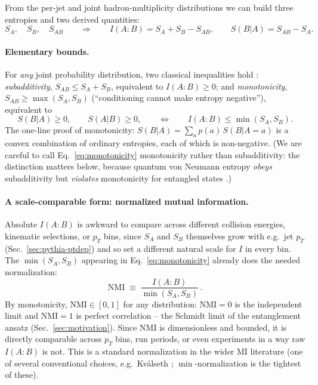 \documentclass[11pt]{article}
\newcommand{\SBA}{S(B|A)}
\newcommand{\NMI}{\mathrm{NMI}}
\begin{document}
From the per-jet and joint hadron-multiplicity distributions we can build
three entropies and two derived quantities:
\begin{equation}
S_A,\quad S_B,\quad S_{AB}
\qquad\Longrightarrow\qquad
I(A{:}B) = S_A+S_B-S_{AB},
\qquad
\SBA = S_{AB}-S_A .
\end{equation}

\paragraph{Elementary bounds.} For \emph{any} joint probability
distribution, two classical inequalities hold \cite{CoverThomas}:
\emph{subadditivity}, $S_{AB}\leq S_A+S_B$, equivalent to $I(A{:}B)\geq0$;
and \emph{monotonicity}, $S_{AB}\geq\max(S_A,S_B)$ (``conditioning cannot
make entropy negative''), equivalent to
\begin{equation}
\SBA \geq 0, \qquad S(A|B)\geq 0,
\qquad\Longleftrightarrow\qquad
I(A{:}B)\leq\min(S_A,S_B).
\label{eq:monotonicity}
\end{equation}
The one-line proof of monotonicity: $\SBA=\sum_a p(a)\,S(B|A{=}a)$ is a
convex combination of ordinary entropies, each of which is non-negative.
(We are careful to call Eq.~\eqref{eq:monotonicity} monotonicity rather
than subadditivity: the distinction matters below, because quantum von
Neumann entropy \emph{obeys} subadditivity but \emph{violates}
monotonicity for entangled states \cite{CerfAdami}.)

\paragraph{A scale-comparable form: normalized mutual information.}
Absolute $I(A{:}B)$ is awkward to compare across different collision
energies, kinematic selections, or $p_T$ bins, since $S_A$ and $S_B$
themselves grow with e.g.\ jet $p_T$ (Sec.~\ref{sec:pythia-ptdep}) and so
set a different natural scale for $I$ in every bin. The
$\min(S_A,S_B)$ appearing in Eq.~\eqref{eq:monotonicity} already does the
needed normalization:
\begin{equation}
\NMI \;\equiv\; \frac{I(A{:}B)}{\min(S_A,S_B)} \, .
\end{equation}
By monotonicity, $\NMI\in[0,1]$ for any distribution: $\NMI=0$ is the
independent limit and $\NMI=1$ is perfect correlation -- the Schmidt
limit of the entanglement ansatz (Sec.~\ref{sec:motivation}). Since
$\NMI$ is dimensionless and bounded, it is directly comparable across
$p_T$ bins, run periods, or even experiments in a way raw $I(A{:}B)$ is
not. This is a standard normalization in the wider MI literature (one of
several conventional choices, e.g.\ Kv\aa{}lseth \cite{Kvalseth1987};
$\min$-normalization is the tightest of these).
\end{document}
